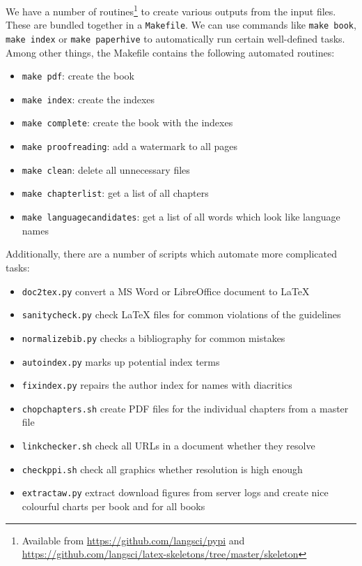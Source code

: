 \documentclass[nonflat,smallfont
]{langsci/langscibook}
\begin{document}
We have a number of routines\footnote{Available from \url{https://github.com/langsci/pypi} and \url{https://github.com/langsci/latex-skeletons/tree/master/skeleton}} to create various outputs from the input files. These are bundled together in a \verb+Makefile+. We can use commands like \verb+make book+, \verb+make index+ or \verb+make paperhive+ to automatically run certain well-defined tasks. Among other things, the Makefile contains the following automated routines: 

\begin{itemize}
 \item \texttt{make pdf}: create the book 
 \item \texttt{make index}: create the indexes
 \item \texttt{make complete}: create the book with the indexes 
 \item \texttt{make proofreading}: add a watermark to all pages 
 \item \texttt{make clean}: delete all unnecessary files 
 \item \texttt{make chapterlist}: get a list of all chapters 
 \item \texttt{make languagecandidates}: get a list of all words which look like language names
\end{itemize}

Additionally, there are a number of scripts which automate more complicated tasks: 

\begin{itemize}
 \item \texttt{doc2tex.py} convert a MS Word or LibreOffice document to \LaTeX\xspace
 \item \texttt{sanitycheck.py} check \LaTeX\xspace files for common violations of the guidelines
 \item \texttt{normalizebib.py} checks a bibliography for common mistakes 
 \item \texttt{autoindex.py} marks up potential index terms 
 \item \texttt{fixindex.py} repairs the author index for names with diacritics
 \item \texttt{chopchapters.sh} create PDF files for the individual chapters from a master file
 \item \texttt{linkchecker.sh} check all URLs in a document whether they resolve
 \item \texttt{checkppi.sh} check all graphics whether resolution is high enough
 \item \texttt{extractaw.py} extract download figures from server logs and create nice colourful charts per book and for all books
\end{itemize}
\end{document}
